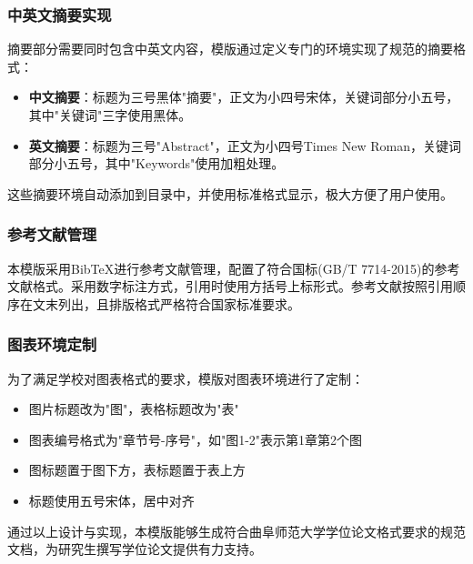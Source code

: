 \subsubsection{中英文摘要实现}
摘要部分需要同时包含中英文内容，模版通过定义专门的环境实现了规范的摘要格式：

\begin{itemize}
    \item \textbf{中文摘要}：标题为三号黑体"摘要"，正文为小四号宋体，关键词部分小五号，其中"关键词"三字使用黑体。
    \item \textbf{英文摘要}：标题为三号"Abstract"，正文为小四号Times New Roman，关键词部分小五号，其中"Keywords"使用加粗处理。
\end{itemize}

这些摘要环境自动添加到目录中，并使用标准格式显示，极大方便了用户使用。

\subsubsection{参考文献管理}
本模版采用BibTeX进行参考文献管理，配置了符合国标(GB/T 7714-2015)的参考文献格式。采用数字标注方式，引用时使用方括号上标形式。参考文献按照引用顺序在文末列出，且排版格式严格符合国家标准要求。

\subsubsection{图表环境定制}
为了满足学校对图表格式的要求，模版对图表环境进行了定制：

\begin{itemize}
    \item 图片标题改为"图"，表格标题改为"表"
    \item 图表编号格式为"章节号-序号"，如"图1-2"表示第1章第2个图
    \item 图标题置于图下方，表标题置于表上方
    \item 标题使用五号宋体，居中对齐
\end{itemize}

通过以上设计与实现，本模版能够生成符合曲阜师范大学学位论文格式要求的规范文档，为研究生撰写学位论文提供有力支持。
